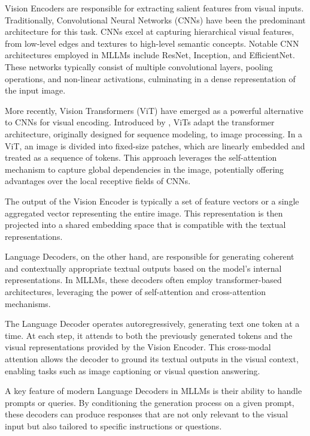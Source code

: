 Vision Encoders are responsible for extracting salient features from visual inputs. Traditionally, Convolutional Neural Networks (CNNs) have been the predominant architecture for this task. CNNs excel at capturing hierarchical visual features, from low-level edges and textures to high-level semantic concepts. Notable CNN architectures employed in MLLMs include ResNet, Inception, and EfficientNet. These networks typically consist of multiple convolutional layers, pooling operations, and non-linear activations, culminating in a dense representation of the input image.

More recently, Vision Transformers (ViT) have emerged as a powerful alternative to CNNs for visual encoding. Introduced by \cite{dosovitskiy2020image}, ViTs adapt the transformer architecture, originally designed for sequence modeling, to image processing. In a ViT, an image is divided into fixed-size patches, which are linearly embedded and treated as a sequence of tokens. This approach leverages the self-attention mechanism to capture global dependencies in the image, potentially offering advantages over the local receptive fields of CNNs.

The output of the Vision Encoder is typically a set of feature vectors or a single aggregated vector representing the entire image. This representation is then projected into a shared embedding space that is compatible with the textual representations.

Language Decoders, on the other hand, are responsible for generating coherent and contextually appropriate textual outputs based on the model's internal representations. In MLLMs, these decoders often employ transformer-based architectures, leveraging the power of self-attention and cross-attention mechanisms.

The Language Decoder operates autoregressively, generating text one token at a time. At each step, it attends to both the previously generated tokens and the visual representations provided by the Vision Encoder. This cross-modal attention allows the decoder to ground its textual outputs in the visual context, enabling tasks such as image captioning or visual question answering.

A key feature of modern Language Decoders in MLLMs is their ability to handle prompts or queries. By conditioning the generation process on a given prompt, these decoders can produce responses that are not only relevant to the visual input but also tailored to specific instructions or questions.

